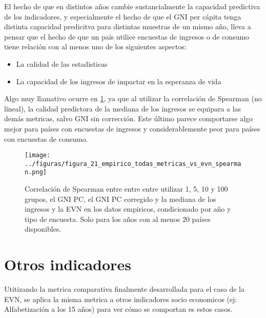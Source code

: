 El hecho de que en distintos años cambie sustancialmente la capacidad predictiva de los indicadores, y especialmente el hecho de que el GNI per cápita tenga distinta capacidad predicitva para distintas muestras de un mismo año, lleva a pensar que el hecho de que un país utilice encuestas de ingresos o de consumo tiene relación con al menos uno de los siguientes aspectos:
\begin{itemize}
    \item La calidad de las estadisticas
    \item La capacidad de los ingresos de impactar en la esperanza de vida
\end{itemize}


Algo muy llamativo ocurre en \ref{fig:21}, ya que al utilizar la correlación de Spearman (no líneal), la calidad predictora de la mediana de los ingresos se equipara a las demás metricas, salvo GNI sin corrección. Este último parece comportarse algo mejor para países con encuestas de ingresos y considerablemente peor para países con encuestas de consumo.

\begin{figure}[H] %
    \centering %
    \texttt{[image: ../figuras/figura\_21\_empirico\_todas\_metricas\_vs\_evn\_spearman.png]} %
    \caption{Correlación de Spearman entre entre entre utilizar 1, 5, 10 y 100 grupos, el GNI PC, el GNI PC corregido y la mediana de los ingresos y la EVN en los datos empiricos, condicionado por año y tipo de encuesta. Solo para los años con al menos 20 países disponibles.}
    \label{fig:21} %
\end{figure}


\section{Otros indicadores}

Utitizando la metrica comparativa finalmente desarrollada para el caso de la EVN, se aplica la misma metrica a otros indicadores socio economicos (ej: Alfabetización a los 15 años) para ver cómo se comportan es estos casos.


